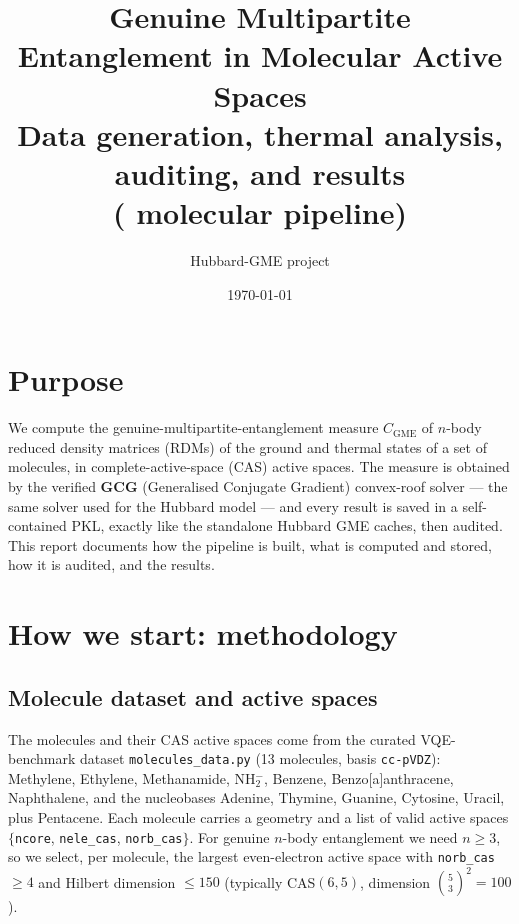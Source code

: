 \documentclass[11pt]{article}
\title{\textbf{Genuine Multipartite Entanglement in Molecular Active Spaces}\\[2pt]
       \large Data generation, thermal analysis, auditing, and results\\
       (\code{hubbard\_gme} molecular pipeline)}
\author{Hubbard-GME project}
\date{\today}
\newcommand{\code}[1]{\texttt{\small #1}}
\newcommand{\CGME}{\ensuremath{C_{\mathrm{GME}}}}
\begin{document}
\maketitle
\tableofcontents
\bigskip

\section{Purpose}
We compute the genuine-multipartite-entanglement measure \CGME{} of $n$-body
reduced density matrices (RDMs) of the ground and thermal states of a set of
molecules, in complete-active-space (CAS) active spaces. The measure is obtained
by the verified \textbf{GCG} (Generalised Conjugate Gradient) convex-roof solver
--- the same solver used for the Hubbard model --- and every result is saved in
a self-contained PKL, exactly like the standalone Hubbard GME caches, then
audited. This report documents how the pipeline is built, what is computed and
stored, how it is audited, and the results.

\section{How we start: methodology}\label{sec:method}

\subsection{Molecule dataset and active spaces}
The molecules and their CAS active spaces come from the curated VQE-benchmark
dataset \code{molecules\_data.py} (13 molecules, basis \code{cc-pVDZ}):
Methylene, Ethylene, Methanamide, NH$_2^-$, Benzene, Benzo[a]anthracene,
Naphthalene, and the nucleobases Adenine, Thymine, Guanine, Cytosine, Uracil,
plus Pentacene. Each molecule carries a geometry and a list of valid active
spaces $\{$\code{ncore}, \code{nele\_cas}, \code{norb\_cas}$\}$. For genuine
$n$-body entanglement we need $n\ge3$, so we select, per molecule, the largest
even-electron active space with \code{norb\_cas}$\ge4$ and Hilbert dimension
$\le150$ (typically CAS$(6,5)$, dimension $\binom{5}{3}^2=100$).
\end{document}
